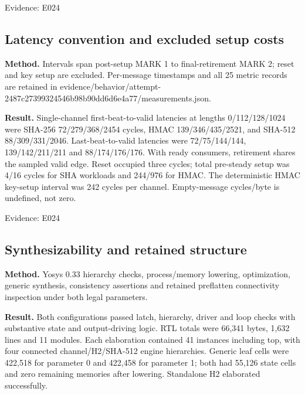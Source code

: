 \documentclass[11pt,a4paper]{article}
\begin{document}
{\small Evidence: E024}

\subsection{Latency convention and excluded setup costs}

\textbf{Method.} Intervals span post-setup MARK 1 to final-retirement MARK 2; reset and key setup are excluded. Per-message timestamps and all 25 metric records are retained in evidence/\allowbreak{}behavior/\allowbreak{}attempt-2487c27399324546b98b90dd6d6e4a77/\allowbreak{}measurements.json.

\textbf{Result.} Single-channel first-beat-to-valid latencies at lengths 0/\allowbreak{}112/\allowbreak{}128/\allowbreak{}1024 were SHA-256 72/\allowbreak{}279/\allowbreak{}368/\allowbreak{}2454 cycles,\allowbreak{} HMAC 139/\allowbreak{}346/\allowbreak{}435/\allowbreak{}2521,\allowbreak{} and SHA-512 88/\allowbreak{}309/\allowbreak{}331/\allowbreak{}2046. Last-beat-to-valid latencies were 72/\allowbreak{}75/\allowbreak{}144/\allowbreak{}144,\allowbreak{} 139/\allowbreak{}142/\allowbreak{}211/\allowbreak{}211 and 88/\allowbreak{}174/\allowbreak{}176/\allowbreak{}176. With ready consumers,\allowbreak{} retirement shares the sampled valid edge. Reset occupied three cycles; total pre-steady setup was 4/\allowbreak{}16 cycles for SHA workloads and 244/\allowbreak{}976 for HMAC. The deterministic HMAC key-setup interval was 242 cycles per channel. Empty-message cycles/\allowbreak{}byte is undefined,\allowbreak{} not zero.

{\small Evidence: E024}

\subsection{Synthesizability and retained structure}

\textbf{Method.} Yosys 0.33 hierarchy checks,\allowbreak{} process/\allowbreak{}memory lowering,\allowbreak{} optimization,\allowbreak{} generic synthesis,\allowbreak{} consistency assertions and retained preflatten connectivity inspection under both legal parameters.

\textbf{Result.} Both configurations passed latch,\allowbreak{} hierarchy,\allowbreak{} driver and loop checks with substantive state and output-driving logic. RTL totals were 66,\allowbreak{}341 bytes,\allowbreak{} 1,\allowbreak{}632 lines and 11 modules. Each elaboration contained 41 instances including top,\allowbreak{} with four connected channel/\allowbreak{}H2/\allowbreak{}SHA-512 engine hierarchies. Generic leaf cells were 422,\allowbreak{}518 for parameter 0 and 422,\allowbreak{}458 for parameter 1; both had 55,\allowbreak{}126 state cells and zero remaining memories after lowering. Standalone H2 elaborated successfully.
\end{document}
